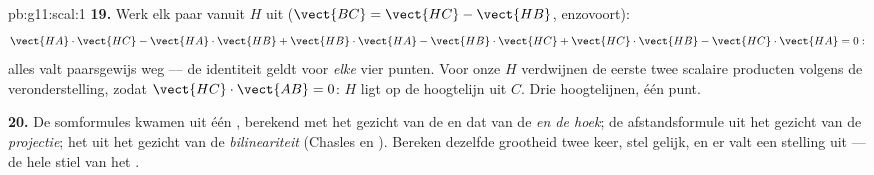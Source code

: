 \begin{solution}{pb:g11:scal:1}
\textbf{19.} Werk elk paar vanuit $H$ uit ($\vect{BC} = \vect{HC} -
\vect{HB}$, enzovoort):
\[
\vect{HA} \cdot \vect{HC} - \vect{HA} \cdot \vect{HB}
+ \vect{HB} \cdot \vect{HA} - \vect{HB} \cdot \vect{HC}
+ \vect{HC} \cdot \vect{HB} - \vect{HC} \cdot \vect{HA} = 0 :
\]
alles valt paarsgewijs weg --- de identiteit geldt voor \emph{elke} vier
punten. Voor onze $H$ verdwijnen de eerste twee scalaire producten volgens
de veronderstelling, zodat $\vect{HC} \cdot \vect{AB} = 0$: $H$ ligt op de
hoogtelijn uit $C$. Drie hoogtelijnen, één punt.

\textbf{20.} De somformules kwamen uit één , berekend met het
gezicht van de \emph{} en dat van de \emph{ en de hoek}; de
afstandsformule uit het gezicht van de \emph{projectie}; het  uit
het gezicht van de \emph{bilineariteit} (Chasles en ). Bereken
dezelfde grootheid twee keer, stel gelijk, en er valt een stelling uit ---
de hele stiel van het .
\end{solution}
